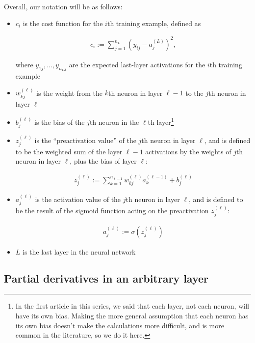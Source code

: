 \documentclass{article}
\begin{document}
	Overall, our notation will be as follows:
	
	\begin{itemize}
		\item $c_i$ is the cost function for the $i$th training example, defined as
		
		\begin{align*}
			c_i := \sum_{j = 1}^{n_L} (y_{ij} - a^{(L)}_j)^2,
		\end{align*}
		
		where $y_{1j}, ..., y_{n_L j}$ are the expected last-layer activations for the $i$th training example
		
		\item $w^{(\ell)}_{kj}$ is the weight from the $k$th neuron in layer $\ell - 1$ to the $j$th neuron in layer $\ell$
		\item $b^{(\ell)}_j$ is the bias of the $j$th neuron in the $\ell$th layer\footnote{In the first article in this series, we said that each layer, not each neuron, will have its own bias. Making the more general assumption that each neuron has its own bias doesn't make the calculations more difficult, and is more common in the literature, so we do it here.}
		\item $z^{(\ell)}_j$ is the ``preactivation value'' of the $j$th neuron in layer $\ell$, and is defined to be the weighted sum of the layer $\ell - 1$ activations by the weights of $j$th neuron in layer $\ell$, plus the bias of layer $\ell$:
		
		\begin{align*}
			z^{(\ell)}_j := \sum_{k = 1}^{n_{\ell-1}} w^{(\ell)}_{kj} a^{(\ell - 1)}_k + b^{(\ell)}_j
		\end{align*}
		
		\item $a^{(\ell)}_j$ is the activation value of the $j$th neuron in layer $\ell$, and is defined to be the result of the sigmoid function acting on the preactivation $z^{(\ell)}_j$:
		
		\begin{align*}
			a^{(\ell)}_j := \sigma(z^{(\ell)}_j)
		\end{align*}
		
		\item $L$ is the last layer in the neural network
	\end{itemize}
	
	\subsection*{Partial derivatives in an arbitrary layer}
	
\end{document}
